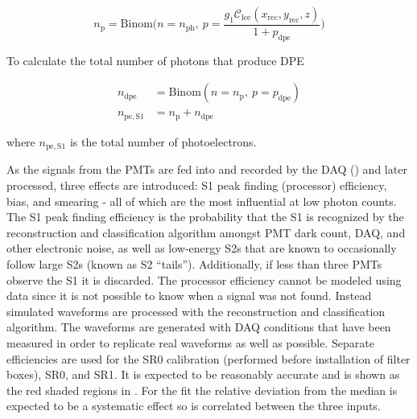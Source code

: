 \vspace{-20pt}

\begin{equation}
n_{\mathrm{p}} = \mathrm{Binom} \bigg( n = n_{\mathrm{ph}},\ p =
\frac{g_1 \mathcal{C}_{\mathrm{lce}}(x_{\mathrm{rec}}, y_{\mathrm{rec}}, z)}{1 + p_{\mathrm{dpe}}} \bigg)
\label{eq:er_nr_calibrations_parameter_determ_det_phys_npe}
\end{equation}

To calculate the total number of photons that produce DPE

\vspace{-25pt}

\begin{subequations}
\begin{align}
n_{\mathrm{dpe}} &= \mathrm{Binom} (n = n_{\mathrm{p}},\ p = p_{\mathrm{dpe}} ) \\
n_{\mathrm{pe,S1}} &= n_{\mathrm{p}} + n_{\mathrm{dpe}}
\end{align}
\label{eq:er_nr_calibrations_parameter_determ_det_phys_num_pe}
\end{subequations}

\vspace{-25pt}

\noindent where $n_{\mathrm{pe,S1}}$ is the total number of photoelectrons.

As the signals from the PMTs are fed into and recorded by the DAQ () and later processed, three effects are
introduced:
S1 peak finding (processor) efficiency, bias, and smearing - all of which are the most influential at low photon counts.  The S1 peak
finding efficiency is the probability that the S1 is recognized by the reconstruction and
classification algorithm amongst PMT dark count, DAQ, and other electronic noise, as well as low-energy S2s that are known to occasionally
follow large S2s (known as S2 ``tails'').  Additionally, if less than three PMTs observe the S1 it is discarded.  The processor efficiency
cannot be modeled using data since it is
not possible to know when a signal was not found.  Instead simulated waveforms are processed with the reconstruction and
classification algorithm.  The
waveforms are generated with DAQ conditions that have been measured in order to replicate real waveforms as well as possible.  Separate
efficiencies are used for the SR0 \ambe calibration (performed before installation of filter boxes), SR0, and SR1.  It is expected to be
reasonably accurate and is shown as the red shaded regions in
.  For the fit the relative deviation from the median is expected to be a
systematic effect so is correlated between the three inputs.

